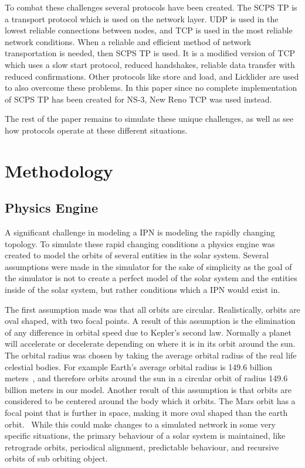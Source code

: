 \documentclass[a4paper,12pt]{article}
\begin{document}
To combat these challenges several protocols have been created. The SCPS TP is a
transport protocol which is used on the network layer. UDP is used in the lowest
reliable connections between nodes, and TCP is used in the most reliable network
conditions. When a reliable and efficient method of network transportation is
needed, then SCPS TP is used. It is a modified version of TCP which uses a slow
start protocol, reduced handshakes, reliable data transfer with reduced
confirmations. Other protocols like store and load, and Licklider are used to
also overcome these problems. In this paper since no complete implementation of
SCPS TP has been created for NS-3, New Reno TCP was used instead.

The rest of the paper remains to simulate these unique challenges, as well as
see how protocols operate at these different situations.

\section{Methodology}

\subsection{Physics Engine}

A significant challenge in modeling a IPN is modeling the rapidly changing
topology. To simulate these rapid changing conditions a physics engine was
created to model the orbits of several entities in the solar system. Several
assumptions were made in the simulator for the sake of simplicity as the goal of
the simulator is not to create a perfect model of the solar system and the
entities inside of the solar system, but rather conditions which a IPN would
exist in.

The first assumption made was that all orbits are circular. Realistically,
orbits are oval shaped, with two focal points. A result of this assumption is
the elimination of any difference in orbital speed due to Kepler's second law.
Normally a planet will accelerate or decelerate depending on where it is in its
orbit around the sun. The orbital radius was chosen by taking the average
orbital radius of the real life celestial bodies. For example Earth's average
orbital radius is 149.6 billion meters~\cite{nasa_earth}, and therefore orbits
around the sun in a circular orbit of radius 149.6 billion meters in our model.
Another result of this assumption is that orbits are considered to be centered
around the body which it orbits. The Mars orbit has a focal point that is
further in space, making it more oval shaped than the earth
orbit.~\cite{nasa_mars} While this could make changes to a simulated network in
some very specific situations, the primary behaviour of a solar system is
maintained, like retrograde orbits, periodical alignment, predictable behaviour,
and recursive orbits of sub orbiting object.
\end{document}
